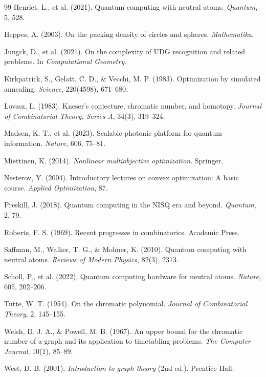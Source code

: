 \documentclass[11pt]{article}
\begin{document}
\begin{thebibliography}{99}
Henriet, L., et al. (2021). Quantum computing with neutral atoms. \textit{Quantum}, 5, 528.

Heppes, A. (2003). On the packing density of circles and spheres. \textit{Mathematika}.

Jungck, D., et al. (2021). On the complexity of UDG recognition and related problems. In \textit{Computational Geometry}.

Kirkpatrick, S., Gelatt, C. D., \& Vecchi, M. P. (1983). Optimization by simulated annealing. \textit{Science}, 220(4598), 671--680.

Lovasz, L. (1983). Kneser's conjecture, chromatic number, and homotopy. \textit{Journal of Combinatorial Theory, Series A}, 34(3), 319--324.

Madsen, K. T., et al. (2023). Scalable photonic platform for quantum information. \textit{Nature}, 606, 75--81.

Miettinen, K. (2014). \textit{Nonlinear multiobjective optimization}. Springer.

Nesterov, Y. (2004). Introductory lectures on convex optimization: A basic course. \textit{Applied Optimization}, 87.

Preskill, J. (2018). Quantum computing in the NISQ era and beyond. \textit{Quantum}, 2, 79.

Roberts, F. S. (1969). Recent progresses in combinatorics. Academic Press.

Saffman, M., Walker, T. G., \& Molmer, K. (2010). Quantum computing with neutral atoms. \textit{Reviews of Modern Physics}, 82(3), 2313.

Scholl, P., et al. (2022). Quantum computing hardware for neutral atoms. \textit{Nature}, 605, 202--206.

Tutte, W. T. (1954). On the chromatic polynomial. \textit{Journal of Combinatorial Theory}, 2, 145--155.

Welsh, D. J. A., \& Powell, M. B. (1967). An upper bound for the chromatic number of a graph and its application to timetabling problems. \textit{The Computer Journal}, 10(1), 85--89.

West, D. B. (2001). \textit{Introduction to graph theory} (2nd ed.). Prentice Hall.

\end{thebibliography}
\end{document}
